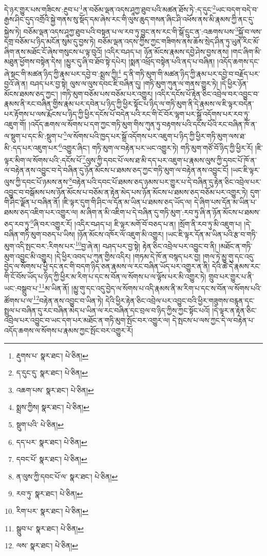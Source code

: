 དེ་ཉར་གྱུར་པས་གཟིངས་:རྔུབ་པ་\footnote{རྡུགས་པ་  སྣར་ཐང་།  པེ་ཅིན། }ན་བཅོམ་ལྡན་འདས་ཤཱཀྱ་ཐུབ་པའི་མཚན་ཐོས་ཏེ་:ད་དུང་\footnote{ད་དུང་དུ་  སྣར་ཐང་།  པེ་ཅིན། }ཡང་བདག་བདེ་བ་རྒྱས་ཤིང་དུད་འགྲོའི་སྐྱེ་གནས་སུ་སྡོད་དམ་ཞེས་རང་གི་ལུས་ཆུད་གསན་ཞིང་ཤི་འཕོས་ནས་མི་རྣམས་ཀྱི་ནང་དུ་སྐྱེས་ཏེ། བཅོམ་ལྡན་འདས་ཤཱཀྱ་ཐུབ་པའི་བསྟན་པ་ལ་རབ་ཏུ་བྱུང་ནས་རང་གི་སྒོ་དྲུང་ན་:འཆགས་པས་\footnote{འཆག་པས་  སྣར་ཐང་།  པེ་ཅིན། }སྐྱོ་བ་ལས་དགྲ་བཅོམ་པ་ཉིད་མངོན་སུམ་དུ་བྱས་ཏེ། བཅོམ་ལྡན་འདས་ཀྱིས་ཀྱང་གཟིགས་ནས་ཆོས་སྲེད་ཤིན་ཏུ་ཡུན་རིང་མོ་ཞིག་ནས་མཐོང་ངོ་ཞེས་གསུངས་པ་ལྟ་བུའོ། །འདིར་བཤད་པ། ཉོན་མོངས་རྣམས་དབྱེ་ཤེས་བྱས་ནས། །གང་ཞིག་མི་མཐུན་ཕྱོགས་བསྟེན་དེས། །མྱུར་དུ་ཞི་བ་ཐོབ་སྟེ་དཔེར། །སྨན་འཕྲོད་བསྟེན་པའི་ནད་པ་བཞིན། །འདོད་ཆགས་དང་ཞེ་སྡང་གི་མཚན་ཉིད་ཀྱི་རྣམ་པར་དབྱེ་བ་:སྨྲས་ཀྱི།\footnote{སྨྲས་ཀྱིས།  སྣར་ཐང་།  པེ་ཅིན། } ད་ནི་གཏི་མུག་གི་མཚན་ཉིད་ཀྱི་རྣམ་པར་དབྱེ་བ་བརྗོད་པར་བྱའོ་ཞེ་ན། བཤད་པར་བྱ་སྟེ། ལུས་ལ་ལུས་དབང་ཇི་བཞིན་དུ། །གཏི་མུག་ཀུན་ལ་གནས་གྱུར་ཏེ། །དེ་ཕྱིར་ཉོན་མོངས་ཐམས་ཅད་ཀྱང་། །གཏི་མུག་བཅོམ་པས་བཅོམ་པར་འགྱུར། །འདིར་དངོས་པོ་རྟེན་ཅིང་འབྲེལ་བར་འབྱུང་བ་རྣམས་ནི་རང་བཞིན་གྱིས་རྣམ་པར་དབེན་པ་ཉིད་ཀྱི་ཕྱིར་སྟོང་པ་ཉིད་ལ་གཏི་མུག་ནི་དེ་རྣམས་ལ་ཇི་ལྟར་བདེན་པར་རྟོགས་པ་ལས་རྨོངས་པ་ཉིད་ཀྱི་ཕྱིར་དངོས་པོ་བདེན་པའི་རང་གི་ངོ་བོར་ལྷག་པར་སྒྲོ་འདོགས་པར་རབ་ཏུ་འཇུག་གོ། །འདོད་ཆགས་ལ་སོགས་པ་དག་ཀྱང་གཏི་མུག་གིས་ཀུན་ཏུ་བརྟགས་པའི་དངོས་པོའི་རང་བཞིན་ཁོ་ན་ལ་སྡུག་པ་དང་མི་:སྡུག་པ་\footnote{སྡུག་པའི་  པེ་ཅིན། }ལ་སོགས་པའི་ཁྱད་པར་སྒྲོ་འདོགས་པར་འཇུག་པ་ཉིད་ཀྱི་ཕྱིར་གཏི་མུག་ལས་ཐ་མི་:དད་པར་འཇུག་པར་\footnote{དད་པར་  སྣར་ཐང་།  པེ་ཅིན། }འགྱུར་ཞིང་། གཏི་མུག་ལ་བརྟེན་པར་ཡང་འགྱུར་ཏེ། གཏི་མུག་གཙོ་བོ་ཉིད་ཀྱི་ཕྱིར་རོ། །ཇི་ལྟར་མིག་ལ་སོགས་པའི་:དངོས་པོ་\footnote{དབང་པོ་  སྣར་ཐང་།  པེ་ཅིན། }ལུས་ཀྱི་དབང་པོ་ལས་ཐ་མི་དད་པར་འཇུག་པ་རྣམས་ལུས་ཀྱི་དབང་པོ་ཁོ་ན་ལ་བརྟེན་ནས་འབྱུང་བ་དེ་བཞིན་དུ་ཉོན་མོངས་པ་ཐམས་ཅད་ཀྱང་གཏི་མུག་ལ་བརྟེན་ནས་འབྱུང་ངོ། །ཡང་ཇི་ལྟར་ལུས་ཀྱི་དབང་པོ་ཉམས་ནས་\footnote{ན་ལུས་ཀྱི་དབང་པོ་ལ་  སྣར་ཐང་།  པེ་ཅིན། }བརྟེན་པའི་དབང་པོ་ཐམས་ཅད་ཉམས་པར་གྱུར་པ་དེ་བཞིན་དུ་རྟེན་ཅིང་འབྲེལ་པར་འབྱུང་བ་བསྒོམས་པས་ཉོན་མོངས་པ་བཅོམ་ན་རྟེན་མེད་པས་ཉོན་མོངས་པ་ཐམས་ཅད་བཅོམ་པར་འགྱུར་ཏེ། དུག་གི་ཤིང་ལྗོན་པ་བཞིན་ནོ། །ཇི་ལྟར་དུག་གི་ཤིང་ལ་དོན་མ་ཡིན་པ་ཐམས་ཅད་ཡོད་ལ། དེ་ཞིག་པས་དོན་མ་ཡིན་པ་ཐམས་ཅད་འཇིག་པར་འགྱུར་ལ། མ་ཞིག་ན་མི་འཇིག་པ་དེ་བཞིན་དུ་གཏི་མུག་:རབ་ཏུ་ཞི་ན་ཉོན་མོངས་པ་ཐམས་ཅད་རབ་ཏུ་\footnote{རབ་ཏུ་  སྣར་ཐང་།  པེ་ཅིན། }ཞི་བར་འགྱུར་རོ། །འདིར་བཤད་པ། ཇི་ལྟར་མགོ་བོ་བཅད་པ་ན། །སྲོག་ནི་རབ་ཏུ་མི་འཇུག་པ། །དེ་བཞིན་གཏི་མུག་བཅད་པ་ཡིས། །ཉོན་མོངས་འཁོར་ལོ་འཇུག་མི་འགྱུར། །ཡང་ཇི་ལྟར་དོན་མ་ཡིན་པའི་རྩ་བ་གཏི་མུག་འདི་སྤང་བར་:རིགས་པར་\footnote{རིག་པར་  སྣར་ཐང་།  པེ་ཅིན། }བྱ་ཞེ་ན། བཤད་པར་བྱ་སྟེ། རྟེན་ཅིང་འབྲེལ་པར་འབྱུང་བ་ནི། །མཐོང་ན་གཏི་མུག་འབྱུང་མི་འགྱུར། །དེ་ཕྱིར་འབད་པ་ཀུན་གྱིས་འདིར། །གཏམ་དེ་ཁོ་ན་བསྙད་པར་བྱ། །གལ་ཏེ་མྱུ་གུ་དང་འདུ་བྱེད་ལ་སོགས་པ་ཕྱི་དང་ནང་གི་བདག་ཉིད་ཅན་རྣམས་ལ་རང་བཞིན་ཡོད་པར་འགྱུར་ན་ནི། དེའི་ཚེ་དེ་རྣམས་རང་གི་ངོ་བོས་ཡོད་པ་ཉིད་ཀྱི་ཕྱིར་མ་རིག་པ་དང་ས་བོན་ལ་སོགས་པ་ལ་ལྟོས་པར་མི་འགྱུར་ཏེ། གྲུབ་པར་གྱུར་པ་ནི་ཡང་:བསྒྲུབ་པ་\footnote{སྒྲུབ་པ་  སྣར་ཐང་།  པེ་ཅིན། }མ་ཡིན་ནོ། །མྱུ་གུ་དང་འདུ་བྱེད་ལ་སོགས་པ་འདི་རྣམས་ནི་མ་རིག་པ་དང་ས་བོན་ལ་སོགས་པའི་ཚོགས་པ་ལ་\footnote{ལས་  སྣར་ཐང་།  པེ་ཅིན། }བརྟེན་ནས་འབྱུང་བ་ཡིན་ཏེ། དེའི་ཕྱིར་རྟེན་ཅིང་འབྲེལ་པར་འབྱུང་བའི་ཕྱིར་གཟུགས་བརྙན་དང་སྤྲུལ་པ་བཞིན་དུ་རང་བཞིན་མེད་པ་ཡིན་ལ་རང་བཞིན་དང་བྲལ་བ་ཉིད་ཀྱིས་ཀྱང་སྟོང་པའོ། །དེ་ལྟར་ན་རྟེན་ཅིང་འབྲེལ་པར་འབྱུང་བ་ཡང་དག་པར་མཐོང་ན་གཏི་མུག་སྤོང་བར་འགྱུར་ལ། དེ་སྤངས་པ་ལས་ཀྱང་དེ་ལ་བརྟེན་པ་འདོད་ཆགས་ལ་སོགས་པ་རྣམས་ཀྱང་སྤོང་བར་འགྱུར་རོ། 